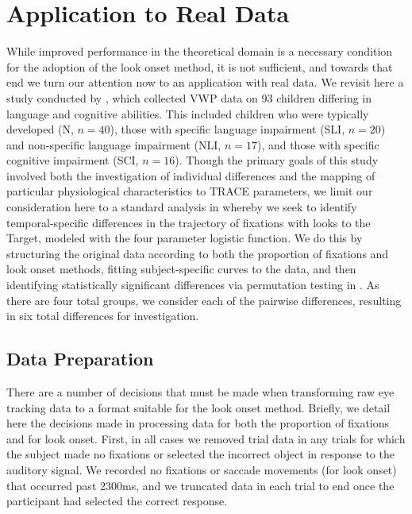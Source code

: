 \section{Application to Real Data}

While improved performance in the theoretical domain is a necessary condition for the adoption of the look onset method, it is not sufficient, and towards that end we turn our attention now to an application with real data. We revisit here a study conducted by \cite{mcmurray2010individual}, which collected VWP data on 93 children differing in language and cognitive abilities. This included children who were typically developed (N, $n = 40$), those with specific language impairment (SLI, $n = 20$) and non-specific language impairment (NLI, $n = 17$), and those with specific cognitive impairment (SCI, $n = 16$). Though the primary goals of this study involved both the investigation of individual differences and the mapping of particular physiological characteristics to TRACE parameters, we limit our consideration here to a standard analysis in  whereby we seek to identify temporal-specific differences in the trajectory of fixations with looks to the Target, modeled with the four parameter logistic function. We do this by structuring the original data according to both the proportion of fixations and look onset methods, fitting subject-specific curves to the data, and then identifying statistically significant differences via permutation testing in . As there are four total groups, we consider each of the pairwise differences, resulting in six total differences for investigation.

\subsection{Data Preparation}

There are a number of decisions that must be made when transforming raw eye tracking data to a format suitable for the look onset method. Briefly, we detail here the decisions made in processing data for both the proportion of fixations and for look onset. First, in all cases we removed trial data in any trials for which the subject made no fixations or selected the incorrect object in response to the auditory signal. We recorded no fixations or saccade movements (for look onset) that occurred past 2300ms, and we truncated data in each trial to end once the participant had selected the correct response.

